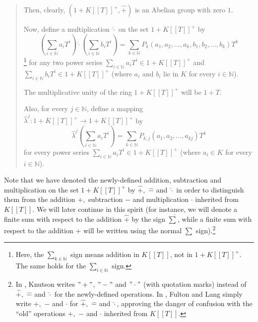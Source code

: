 \documentclass[numbers=enddot,12pt,final,onecolumn,notitlepage]{scrartcl}%
\begin{document}
\begin{quote}
Then, clearly, $\left(  1+K\left[  \left[  T\right]  \right]  ^{+}%
,\widehat{+}\right)  $ is an Abelian group with zero $1$.

Now, define a multiplication $\widehat{\cdot}$ on the set $1+K\left[  \left[
T\right]  \right]  ^{+}$ by%
\[
\left(  \sum_{i\in\mathbb{N}}a_{i}T^{i}\right)  \widehat{\cdot}\left(
\sum_{i\in\mathbb{N}}b_{i}T^{i}\right)  =\sum_{k\in\mathbb{N}}P_{k}\left(
a_{1},a_{2},...,a_{k},b_{1},b_{2},...,b_{k}\right)  T^{k}%
\]
\footnote{Here, the $\sum\limits_{k\in\mathbb{N}}$ sign means addition in
$K\left[  \left[  T\right]  \right]  $, not in $1+K\left[  \left[  T\right]
\right]  ^{+}$. The same holds for the $\sum\limits_{i\in\mathbb{N}}$ sign.}
for any two power series $\sum\limits_{i\in\mathbb{N}}a_{i}T^{i}\in1+K\left[
\left[  T\right]  \right]  ^{+}$ and $\sum\limits_{i\in\mathbb{N}}b_{i}%
T^{i}\in1+K\left[  \left[  T\right]  \right]  ^{+}$ (where $a_{i}$ and $b_{i}$
lie in $K$ for every $i\in\mathbb{N}$).

The multiplicative unity of the ring $1+K\left[  \left[  T\right]  \right]
^{+}$ will be $1+T$.

Also, for every $j\in\mathbb{N}$, define a mapping $\widehat{\lambda}%
^{j}:1+K\left[  \left[  T\right]  \right]  ^{+}\rightarrow1+K\left[  \left[
T\right]  \right]  ^{+}$ by%
\[
\widehat{\lambda}^{j}\left(  \sum_{i\in\mathbb{N}}a_{i}T^{i}\right)
=\sum_{k\in\mathbb{N}}P_{k,j}\left(  a_{1},a_{2},...,a_{kj}\right)  T^{k}%
\]
for every power series $\sum\limits_{i\in\mathbb{N}}a_{i}T^{i}\in1+K\left[
\left[  T\right]  \right]  ^{+}$ (where $a_{i}\in K$ for every $i\in
\mathbb{N}$).
\end{quote}

Note that we have denoted the newly-defined addition, subtraction and
multiplication on the set $1+K\left[  \left[  T\right]  \right]  ^{+}$ by
$\widehat{+},$ $\widehat{-}$ and $\widehat{\cdot}$ in order to distinguish
them from the addition $+,$ subtraction $-$ and multiplication $\cdot$
inherited from $K\left[  \left[  T\right]  \right]  $. We will later continue
in this spirit (for instance, we will denote a finite sum with respect to the
addition $\widehat{+}$ by the sign $\widehat{\sum}$, while a finite sum with
respect to the addition $+$ will be written using the normal $\sum$
sign).\footnote{In \cite{Knut73}, Knutson writes $"+"$, $"-"$ and $"\cdot"$
(with quotation marks) instead of $\widehat{+},$ $\widehat{-}$ and
$\widehat{\cdot}$ for the newly-defined operations. In \cite{FulLan85}, Fulton
and Lang simply write $+,$ $-$ and $\cdot$ for $\widehat{+},$ $\widehat{-}$
and $\widehat{\cdot}$, approving the danger of confusion with the ``old''
operations $+,$ $-$ and $\cdot$ inherited from $K\left[  \left[  T\right]
\right]  $.}
\end{document}
